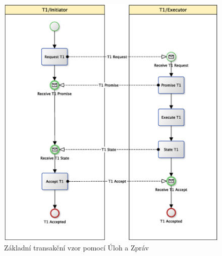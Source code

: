\documentclass[]{article}
\begin{document}
\begin{figure}[H]\centering
\includegraphics[width=\textwidth,height=\textheight,keepaspectratio]{obrazky/transaction-basic-messages}
\caption{Základní transakční vzor pomocí Úloh a Zpráv}
\label{fig:Zk_trans_ulohy_zpravy}
\end{figure}
\end{document}
